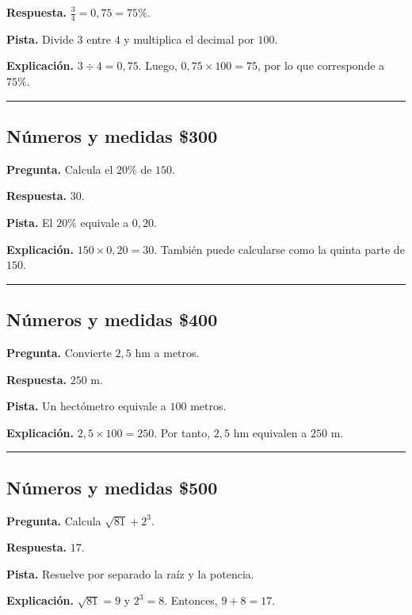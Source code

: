 \documentclass[11pt,letterpaper]{article}
\begin{document}
\textbf{Respuesta.} $\frac{3}{4}=0{,}75=75\%$.

\textbf{Pista.} Divide $3$ entre $4$ y multiplica el decimal por $100$.

\textbf{Explicación.} $3\div4=0{,}75$. Luego, $0{,}75\times100=75$, por lo que corresponde a $75\%$.


\vspace{0.8em}
\hrule
\vspace{1.1em}


\subsection*{\textcolor{DeepBlue}{Números y medidas} \hfill \$300}
\textbf{Pregunta.} Calcula el $20\%$ de $150$.


\textbf{Respuesta.} $30$.

\textbf{Pista.} El $20\%$ equivale a $0{,}20$.

\textbf{Explicación.} $150\times0{,}20=30$. También puede calcularse como la quinta parte de $150$.


\vspace{0.8em}
\hrule
\vspace{1.1em}


\subsection*{\textcolor{DeepBlue}{Números y medidas} \hfill \$400}
\textbf{Pregunta.} Convierte $2{,}5$ hm a metros.


\textbf{Respuesta.} $250$ m.

\textbf{Pista.} Un hectómetro equivale a $100$ metros.

\textbf{Explicación.} $2{,}5\times100=250$. Por tanto, $2{,}5$ hm equivalen a $250$ m.


\vspace{0.8em}
\hrule
\vspace{1.1em}


\subsection*{\textcolor{DeepBlue}{Números y medidas} \hfill \$500}
\textbf{Pregunta.} Calcula $\sqrt{81}+2^3$.


\textbf{Respuesta.} $17$.

\textbf{Pista.} Resuelve por separado la raíz y la potencia.

\textbf{Explicación.} $\sqrt{81}=9$ y $2^3=8$. Entonces, $9+8=17$.
\end{document}
